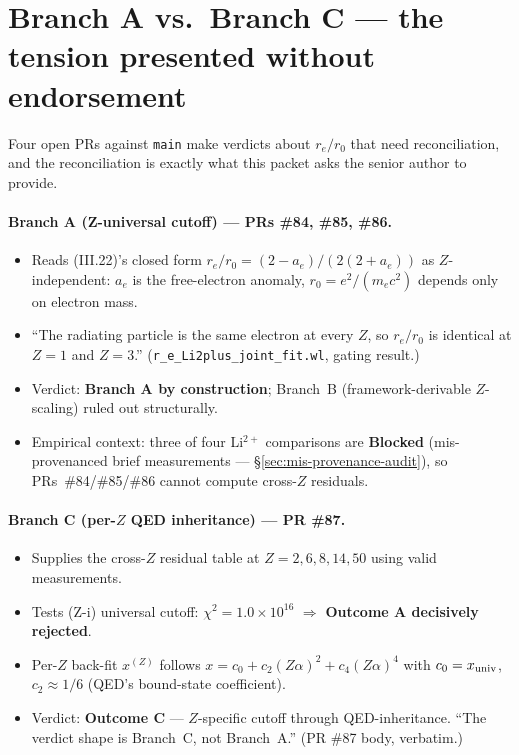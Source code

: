 \section{Branch A vs.~Branch C --- the tension presented without endorsement}
\label{sec:branch-a-vs-c}

Four open PRs against \texttt{main} make verdicts about $r_e/r_0$ that need
reconciliation, and the reconciliation is exactly what this packet asks the
senior author to provide.

\paragraph{Branch A (Z-universal cutoff) --- PRs \#84, \#85, \#86.}
\begin{itemize}[topsep=2pt,itemsep=0pt]
  \item Reads (III.22)'s closed form $r_e/r_0 = (2 - a_e)/(2(2 + a_e))$ as
        $Z$-independent: $a_e$ is the free-electron anomaly,
        $r_0 = e^2/(m_e c^2)$ depends only on electron mass.
  \item ``The radiating particle is the same electron at every $Z$, so
        $r_e/r_0$ is identical at $Z=1$ and $Z=3$.''
        (\texttt{r\_e\_Li2plus\_joint\_fit.wl}, gating result.)
  \item Verdict: \textbf{Branch A by construction}; Branch~B
        (framework-derivable $Z$-scaling) ruled out structurally.
  \item Empirical context: three of four Li$^{2+}$ comparisons are
        \textbf{Blocked} (mis-provenanced brief measurements ---
        \S\ref{sec:mis-provenance-audit}), so PRs~\#84/\#85/\#86
        cannot compute cross-$Z$ residuals.
\end{itemize}

\paragraph{Branch C (per-$Z$ QED inheritance) --- PR \#87.}
\begin{itemize}[topsep=2pt,itemsep=0pt]
  \item Supplies the cross-$Z$ residual table at $Z = 2, 6, 8, 14, 50$ using
        valid measurements.
  \item Tests (Z-i) universal cutoff: $\chi^2 = 1.0\times 10^{16}$
        $\Rightarrow$ \textbf{Outcome A decisively rejected}.
  \item Per-$Z$ back-fit $x^{(Z)}$ follows
        $x = c_0 + c_2 (Z\alpha)^2 + c_4 (Z\alpha)^4$ with
        $c_0 = x_{\rm univ}$, $c_2 \approx 1/6$ (QED's bound-state coefficient).
  \item Verdict: \textbf{Outcome C} --- $Z$-specific cutoff through
        QED-inheritance. ``The verdict shape is Branch~C, not Branch~A.''
        (PR \#87 body, verbatim.)
\end{itemize}


